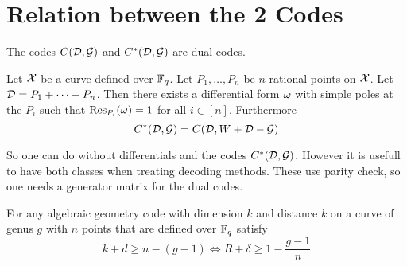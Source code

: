 \section{Relation between the 2 Codes}
\begin{theorem}
	The codes $C(\mathcal{D},\mathcal{G})$ and $C^*(\mathcal{D},\mathcal{G})$ are dual codes.
\end{theorem}
\begin{theorem}
	Let $\mathcal{X}$ be a curve defined over $\mathbb{F}_q$. Let $P_1,\dots, P_n$ be $n$ rational points on $\mathcal{X}$. Let $\mathcal{D}=P_1+\cdots+P_n$. Then there exists a differential form $\omega$ with simple poles at the $P_i$ such that $\operatorname{Res}_{P_i}(\omega)=1$ for all $i\in [n]$. Furthermore $$C^*(\mathcal{D},\mathcal{G})=C(\mathcal{D},W+\mathcal{D}-\mathcal{G})$$
\end{theorem}
So one can do without differentials and the codes $C^*(\mathcal{D},\mathcal{G})$. However it is usefull to have both classes when treating decoding methods. These use parity check, so one needs a generator matrix for the dual codes.

\begin{theorem}
	For any algebraic geometry code with dimension $k$ and distance $k$ on a curve of genus $g$ with $n$ points that are defined over $\mathbb{F}_q$ satisfy $$k+d\geq n-(g-1)\iff R+\delta \geq 1-\frac{g-1}{n}$$
\end{theorem}